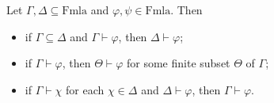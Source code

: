 Let $\Gamma, \Delta \subseteq \text{Fmla}$ and $\varphi, \psi \in \text{Fmla}$. Then

\begin{itemize}
\item[(i)] if $\Gamma \subseteq \Delta$ and $\Gamma \vdash \varphi$, then $\Delta \vdash \varphi$;
\item[(ii)] if $\Gamma \vdash \varphi$, then $\Theta \vdash \varphi$ for some finite subset $\Theta$ of $\Gamma$;
\item[(iii)] if $\Gamma \vdash \chi$ for each $\chi \in \Delta$ and $\Delta \vdash \varphi$, then $\Gamma \vdash \varphi$.
\end{itemize}
